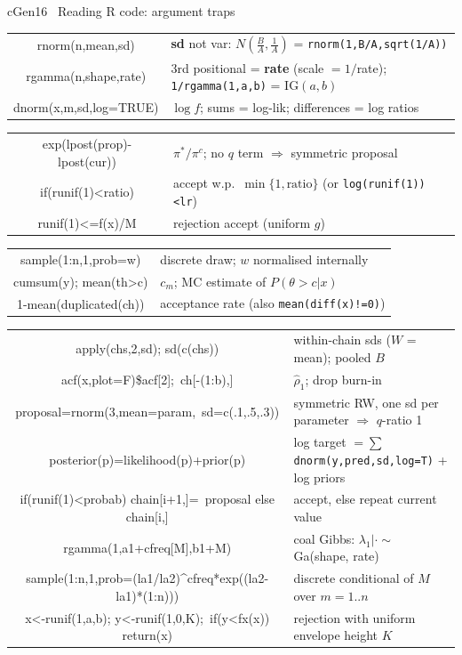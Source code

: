 \documentclass{article}
\newcommand{\rc}[1]{\texttt{#1}}
\begin{document}
\begin{multicols*}{3}
\begin{tb}{cGen}{16 \textbullet\ Reading R code: argument traps}
\begin{tabularx}{\linewidth}{@{}C{0.4}|L@{}}
rnorm(n,mean,sd) & \textbf{sd} not var: $N(\frac BA,\frac1A)$ = \rc{rnorm(1,B/A,sqrt(1/A))}\\
rgamma(n,shape,rate) & 3rd positional = \textbf{rate} (scale $=1/$rate); \rc{1/rgamma(1,a,b)} = IG$(a,b)$\\
dnorm(x,m,sd,log=TRUE) & $\log f$; sums = log-lik; differences = log ratios\\
\end{tabularx}\par\nointerlineskip
\begin{tabularx}{\linewidth}{@{}C{0.4}|L@{}}
exp(lpost(prop)-lpost(cur)) & $\pi^*/\pi^c$; no $q$ term $\Rightarrow$ symmetric proposal\\
if(runif(1)<ratio) & accept w.p.\ $\min\{1,\text{ratio}\}$ (or \rc{log(runif(1))<lr})\\
runif(1)<=f(x)/M & rejection accept (uniform $g$)\\
\end{tabularx}\par\nointerlineskip
\begin{tabularx}{\linewidth}{@{}C{0.4}|L@{}}
sample(1:n,1,prob=w) & discrete draw; $w$ normalised internally\\
cumsum(y); mean(th>c) & $c_m$; MC estimate of $P(\theta>c|x)$\\
1-mean(duplicated(ch)) & acceptance rate (also \rc{mean(diff(x)!=0)})\\
\end{tabularx}\par\nointerlineskip
\begin{tabularx}{\linewidth}{@{}C{0.4}|L@{}}
apply(chs,2,sd); sd(c(chs)) & within-chain sds ($W$ = mean); pooled $B$\\
acf(x,plot=F)\$acf[2];\newline\ ch[-(1:b),] & $\hat\rho_1$; drop burn-in\\
proposal=rnorm(3,mean=param,\newline\ sd=c(.1,.5,.3)) & symmetric RW, one sd per parameter $\Rightarrow$ $q$-ratio 1\\
posterior(p)=likelihood(p)+prior(p) & log target $=\sum$\rc{dnorm(y,pred,sd,log=T)} + log priors\\
if(runif(1)<probab) chain[i+1,]=\newline\ proposal else chain[i,] & accept, else repeat current value\\
rgamma(1,a1+cfreq[M],b1+M) & coal Gibbs: $\lambda_1|\cdot\sim$Ga(shape, rate)\\
sample(1:n,1,prob=(la1/la2)\^{}\newline cfreq*exp((la2-la1)*(1:n))) & discrete conditional of $M$ over $m=1..n$\\
x<-runif(1,a,b); y<-runif(1,0,K);\newline\ if(y<fx(x)) return(x) & rejection with uniform envelope height $K$\\
\end{tabularx}
\end{tb}


\end{multicols*}
\end{document}
